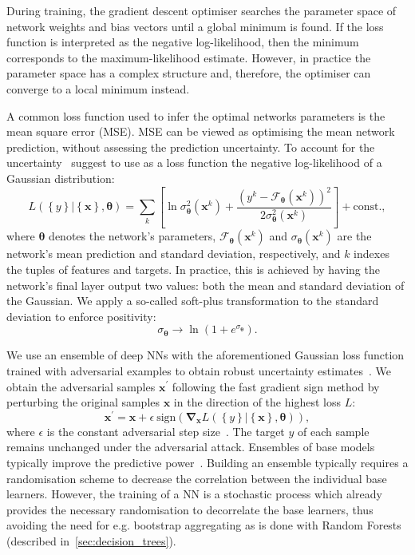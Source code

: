\documentclass[useAMS,usenatbib]{mnras}
\begin{document}
During training, the gradient descent optimiser searches the parameter space of network weights and bias vectors until a global minimum is found. If the loss function is interpreted as the negative log-likelihood, then the minimum corresponds to the maximum-likelihood estimate. However, in practice the parameter space has a complex structure and, therefore, the optimiser can converge to a local minimum instead.

A common loss function used to infer the optimal networks parameters is the mean square error (MSE). MSE can be viewed as optimising the mean network prediction, without assessing the prediction uncertainty. To account for the uncertainty~\cite{Nix_mean_variance} suggest to use as a loss function the negative log-likelihood of a Gaussian distribution:
\begin{equation}
    \label{eq:Gaussian loss function}
    L\left(\left\{y\right\} | \left\{\bm{x}\right\}, \bm{\bm{\theta}}\right)
    =  \sum_k\left[ \ln \sigma_{\bm{\theta}}^{2}(\bm{x}^k) + \frac{\left(y^k - \mathcal{F}_{\bm{\theta}}(\bm{x}^k)\right)^2}{2\sigma_{\bm{\theta}}^{2}(\bm{x}^k)}\right] + \mathrm{const.},
\end{equation}
where $\bm{\theta}$ denotes the network's parameters, $\mathcal{F}_{\bm{\theta}} (\bm{x}^k)$ and $\sigma_{\bm{\theta}}(\bm{x}^k)$ are the network's mean prediction and standard deviation, respectively, and $k$ indexes the tuples of features and targets. In practice, this is achieved by having the network's final layer output two values: both the mean and standard deviation of the Gaussian. We apply a so-called soft-plus transformation to the standard deviation to enforce positivity:
\begin{equation}
    \sigma_{\bm{\theta}} \to \ln \left( 1 + e^{\sigma_{\bm{\theta}}} \right).
\end{equation}

We use an ensemble of deep \acp{NN} with the aforementioned Gaussian loss function trained with adversarial examples to obtain robust uncertainty estimates~\citep{Lakshminarayanan_deep_ensembles}.
We obtain the adversarial samples $\bm{x}^\prime$ following the fast gradient sign method by perturbing the original samples $\bm{x}$ in the direction of the highest loss $L$:
\begin{equation}\label{eq:fast_gradient}
    \bm{x}^\prime
    =
    \bm{x} + \epsilon~\mathrm{sign}\left(\bm{\nabla}_{\bm x} L\left(\left\{y\right\} | \left\{\bm{x}\right\}, \bm{\bm{\theta}}\right)\right),
\end{equation}
where $\epsilon$ is the constant adversarial step size~\citep{Goodfellow_adversarial_examples}. The target $y$ of each sample remains unchanged under the adversarial attack.
Ensembles of base models typically improve the predictive power~\citep{Dietterich_ensembles}. Building an ensemble typically requires a randomisation scheme to decrease the correlation between the individual base learners. However, the training of a \ac{NN} is a stochastic process which already provides the necessary randomisation to decorrelate the base learners, thus avoiding the need for e.g. bootstrap aggregating as is done with Random Forests (described in~\cref{sec:decision_trees}).
\end{document}
